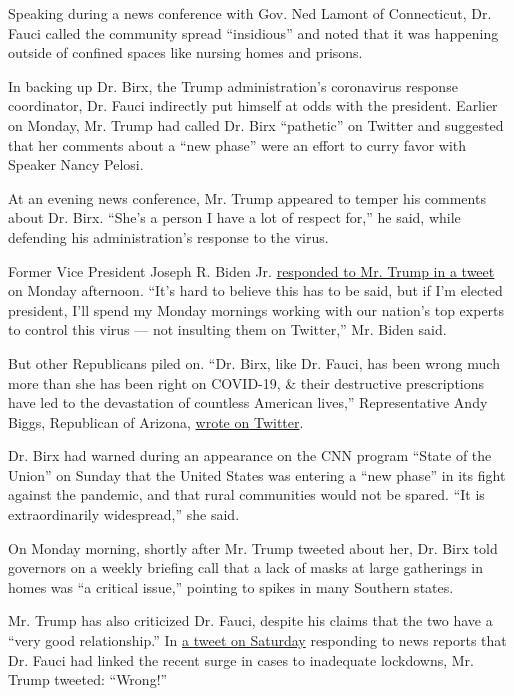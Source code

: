 Speaking during a news conference with Gov. Ned Lamont of Connecticut,
Dr. Fauci called the community spread ``insidious'' and noted that it
was happening outside of confined spaces like nursing homes and prisons.

In backing up Dr. Birx, the Trump administration's coronavirus response
coordinator, Dr. Fauci indirectly put himself at odds with the
president. Earlier on Monday, Mr. Trump had called Dr. Birx ``pathetic''
on Twitter and suggested that her comments about a ``new phase'' were an
effort to curry favor with Speaker Nancy Pelosi.

At an evening news conference, Mr. Trump appeared to temper his comments
about Dr. Birx. ``She's a person I have a lot of respect for,'' he said,
while defending his administration's response to the virus.

Former Vice President Joseph R. Biden Jr.
\href{https://twitter.com/JoeBiden/status/1290350721515139072}{responded
to Mr. Trump in a tweet} on Monday afternoon. ``It's hard to believe
this has to be said, but if I'm elected president, I'll spend my Monday
mornings working with our nation's top experts to control this virus ---
not insulting them on Twitter,'' Mr. Biden said.

But other Republicans piled on. ``Dr. Birx, like Dr. Fauci, has been
wrong much more than she has been right on COVID-19, \& their
destructive prescriptions have led to the devastation of countless
American lives,'' Representative Andy Biggs, Republican of Arizona,
\href{https://twitter.com/RepAndyBiggsAZ/status/1290297517582610433?s=20}{wrote
on Twitter}.

Dr. Birx had warned during an appearance on the CNN program ``State of
the Union'' on Sunday that the United States was entering a ``new
phase'' in its fight against the pandemic, and that rural communities
would not be spared. ``It is extraordinarily widespread,'' she said.

On Monday morning, shortly after Mr. Trump tweeted about her, Dr. Birx
told governors on a weekly briefing call that a lack of masks at large
gatherings in homes was ``a critical issue,'' pointing to spikes in many
Southern states.

Mr. Trump has also criticized Dr. Fauci, despite his claims that the two
have a ``very good relationship.'' In
\href{https://twitter.com/realDonaldTrump/status/1289633359681839105}{a
tweet on Saturday} responding to news reports that Dr. Fauci had linked
the recent surge in cases to inadequate lockdowns, Mr. Trump tweeted:
``Wrong!''

